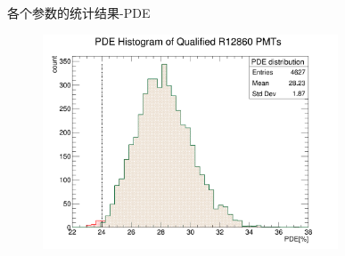 \begin{frame}{各个参数的统计结果-PDE}
\begin{figure}
\centering
\includegraphics[width=0.78\textwidth]{figures/pde.png}
\end{figure}
\end{frame}
